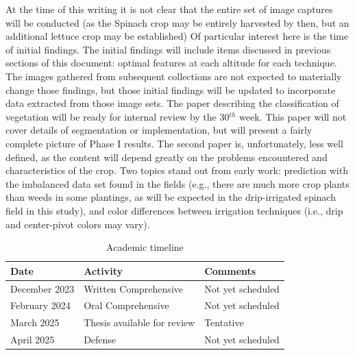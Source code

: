 \documentclass[12pt]{article}
\begin{document}
At the time of this writing it is not clear that the entire set of image captures will be conducted (as the Spinach crop may be entirely harvested by then, but an additional lettuce crop may be established)
Of particular interest here is the time of initial findings. The initial findings will include items discussed in previous sections of this document: optimal features at each altitude for each technique. The images gathered from subsequent collections are not expected to materially change those findings, but those initial findings will be updated to incorporate data extracted from those image sets. The paper describing the classification of vegetation will be ready for internal review by the 30$^{th}$ week. This paper will not cover details of segmentation or implementation, but will present a fairly complete picture of Phase I results. The second paper is, unfortunately, less well defined, as the content will depend greatly on the problems encountered and characteristics of the crop. Two topics stand out from early work: prediction with the imbalanced data set found in the fields (e.g., there are much more crop plants than weeds in some plantings, as will be expected in the drip-irrigated spinach field in this study), and color differences between irrigation techniques (i.e., drip and center-pivot colors may vary).

\begin{table}[ht]
	\centering
    \caption{Academic timeline}
    \label{tab:timeline}
    \begin{tabular}[t]{lll} 
		\textbf{Date} & \textbf{Activity} &\textbf{Comments}\\
		\midrule
			December 2023 & Written Comprehensive & Not yet scheduled\\
			February 2024 & Oral Comprehensive & Not yet scheduled\\
			March 2025 & Thesis available for review & Tentative\\
			April 2025 & Defense & Not yet scheduled\\

    \end{tabular}
\end{table}

 \newpage
%
%
\end{document}
